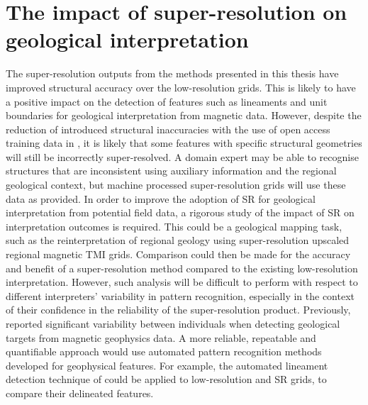 \section[Super-resolution impact on geological interpretation]{The impact of super-resolution on geological interpretation}
The super-resolution outputs from the methods presented in this thesis have improved structural accuracy over the low-resolution grids.
This is likely to have a positive impact on the detection of features such as lineaments and unit boundaries for geological interpretation from magnetic data.
However, despite the reduction of introduced structural inaccuracies with the use of open access training data in , it is likely that some features with specific structural geometries will still be incorrectly super-resolved.
A domain expert may be able to recognise structures that are inconsistent using auxiliary information and the regional geological context, but machine processed super-resolution grids will use these data as provided.
In order to improve the adoption of SR for geological interpretation from potential field data, a rigorous study of the impact of SR on interpretation outcomes is required.
This could be a geological mapping task, such as the reinterpretation of regional geology using super-resolution upscaled regional magnetic TMI grids.
Comparison could then be made for the accuracy and benefit of a super-resolution method compared to the existing low-resolution interpretation.
However, such analysis will be difficult to perform with respect to different interpreters' variability in pattern recognition, especially in the context of their confidence in the reliability of the super-resolution product.
Previously, \textcite{sivarajahIdentifyingEffectiveInterpretation2013} reported significant variability between individuals when detecting geological targets from magnetic geophysics data.
A more reliable, repeatable and quantifiable approach would use automated pattern recognition methods developed for geophysical features.
For example, the automated lineament detection technique of \textcite{holdenAutomaticIdentificationResponses2011,holdenAutomatedAnalysisRegional2008} could be applied to low-resolution and SR grids, to compare their delineated features.

